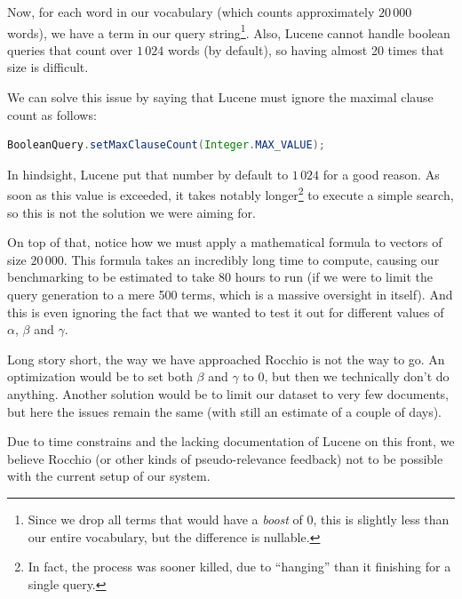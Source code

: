 \documentclass[11pt]{article}
\begin{document}
Now, for each word in our vocabulary (which counts approximately $20\,000$ words), we have a term in our query string\footnote{Since we drop all terms that would have a \textit{boost} of 0, this is slightly less than our entire vocabulary, but the difference is nullable.}. Also, Lucene cannot handle boolean queries that count over $1\,024$ words (by default), so having almost 20 times that size is difficult.

We can solve this issue by saying that Lucene must ignore the maximal clause count as follows:
\begin{lstlisting}[language=Java]
BooleanQuery.setMaxClauseCount(Integer.MAX_VALUE);
\end{lstlisting}

In hindsight, Lucene put that number by default to $1\,024$ for a good reason. As soon as this value is exceeded, it takes notably longer\footnote{In fact, the process was sooner killed, due to ``hanging'' than it finishing for a single query.} to execute a simple search, so this is not the solution we were aiming for.

On top of that, notice how we must apply a mathematical formula to vectors of size $20\,000$. This formula takes an incredibly long time to compute, causing our benchmarking to be estimated to take 80 hours to run (if we were to limit the query generation to a mere 500 terms, which is a massive oversight in itself). And this is even ignoring the fact that we wanted to test it out for different values of $\alpha$, $\beta$ and $\gamma$.

Long story short, the way we have approached Rocchio is not the way to go. An optimization would be to set both $\beta$ and $\gamma$ to 0, but then we technically don't do anything. Another solution would be to limit our dataset to very few documents, but here the issues remain the same (with still an estimate of a couple of days).

Due to time constrains and the lacking documentation of Lucene on this front, we believe Rocchio (or other kinds of pseudo-relevance feedback) not to be possible with the current setup of our system.

\clearpage


\end{document}
